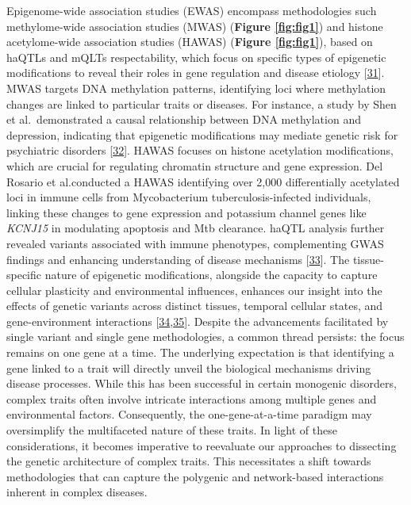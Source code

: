 Epigenome-wide association studies (EWAS) encompass methodologies such methylome-wide association studies (MWAS) (\textbf{Figure \ref{fig:fig1}}) and histone acetylome-wide association studies (HAWAS) (\textbf{Figure \ref{fig:fig1}}), based on haQTLs and mQLTs respectability, which focus on specific types of epigenetic modifications to reveal their roles in gene regulation and disease etiology {[}\protect\hyperlink{ref-TPqvAJda}{31}{]}.
MWAS targets DNA methylation patterns, identifying loci where methylation changes are linked to particular traits or diseases.
For instance, a study by Shen et al.~demonstrated a causal relationship between DNA methylation and depression, indicating that epigenetic modifications may mediate genetic risk for psychiatric disorders {[}\protect\hyperlink{ref-1DNxNkLsT}{32}{]}.
HAWAS focuses on histone acetylation modifications, which are crucial for regulating chromatin structure and gene expression.
Del Rosario et al.conducted a HAWAS identifying over 2,000 differentially acetylated loci in immune cells from Mycobacterium tuberculosis-infected individuals, linking these changes to gene expression and potassium channel genes like \emph{KCNJ15} in modulating apoptosis and Mtb clearance.
haQTL analysis further revealed variants associated with immune phenotypes, complementing GWAS findings and enhancing understanding of disease mechanisms {[}\protect\hyperlink{ref-1BYHeZlgB}{33}{]}.
The tissue-specific nature of epigenetic modifications, alongside the capacity to capture cellular plasticity and environmental influences, enhances our insight into the effects of genetic variants across distinct tissues, temporal cellular states, and gene-environment interactions {[}\protect\hyperlink{ref-FeaSnwhX}{34},\protect\hyperlink{ref-KfWCLspO}{35}{]}.
Despite the advancements facilitated by single variant and single gene methodologies, a common thread persists: the focus remains on one gene at a time.
The underlying expectation is that identifying a gene linked to a trait will directly unveil the biological mechanisms driving disease processes.
While this has been successful in certain monogenic disorders, complex traits often involve intricate interactions among multiple genes and environmental factors.
Consequently, the one-gene-at-a-time paradigm may oversimplify the multifaceted nature of these traits.
In light of these considerations, it becomes imperative to reevaluate our approaches to dissecting the genetic architecture of complex traits.
This necessitates a shift towards methodologies that can capture the polygenic and network-based interactions inherent in complex diseases.

